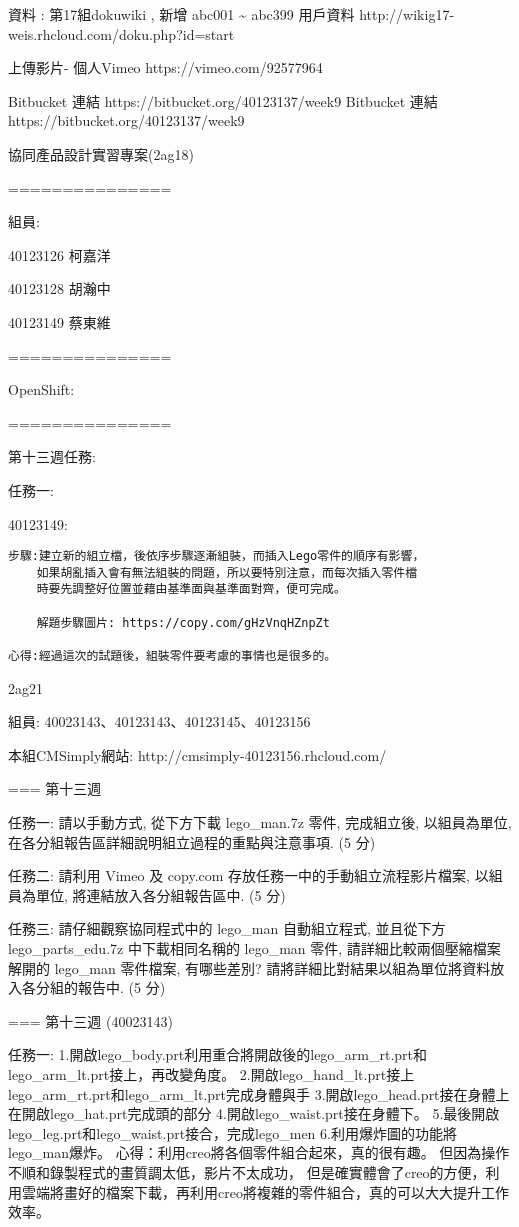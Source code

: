\documentclass[]{article}
\begin{document}
資料 : 第17組dokuwiki , 新增 abc001 \textasciitilde{} abc399 用戶資料
http://wikig17-weis.rhcloud.com/doku.php?id=start

上傳影片- 個人Vimeo https://vimeo.com/92577964

Bitbucket 連結 https://bitbucket.org/40123137/week9 Bitbucket 連結
https://bitbucket.org/40123137/week9

協同產品設計實習專案(2ag18)

===============

組員:

40123126 柯嘉洋

40123128 胡瀚中

40123149 蔡東維

===============

OpenShift:

===============

第十三週任務:

任務一:

40123149:

\begin{verbatim}
步驟:建立新的組立檔，後依序步驟逐漸組裝，而插入Lego零件的順序有影響，
    如果胡亂插入會有無法組裝的問題，所以要特別注意，而每次插入零件檔
    時要先調整好位置並藉由基準面與基準面對齊，便可完成。

    解題步驟圖片: https://copy.com/gHzVnqHZnpZt
    
心得:經過這次的試題後，組裝零件要考慮的事情也是很多的。
\end{verbatim}

2ag21

組員: 40023143、40123143、40123145、40123156

本組CMSimply網站: http://cmsimply-40123156.rhcloud.com/

=== 第十三週

任務一: 請以手動方式, 從下方下載 lego\_man.7z 零件, 完成組立後,
以組員為單位, 在各分組報告區詳細說明組立過程的重點與注意事項. (5 分)

任務二: 請利用 Vimeo 及 copy.com 存放任務一中的手動組立流程影片檔案,
以組員為單位, 將連結放入各分組報告區中. (5 分)

任務三: 請仔細觀察協同程式中的 lego\_man 自動組立程式, 並且從下方
lego\_parts\_edu.7z 中下載相同名稱的 lego\_man 零件,
請詳細比較兩個壓縮檔案解開的 lego\_man 零件檔案, 有哪些差別?
請將詳細比對結果以組為單位將資料放入各分組的報告中. (5 分)

=== 第十三週 (40023143)

任務一:
1.開啟lego\_body.prt利用重合將開啟後的lego\_arm\_rt.prt和lego\_arm\_lt.prt接上，再改變角度。
2.開啟lego\_hand\_lt.prt接上lego\_arm\_rt.prt和lego\_arm\_lt.prt完成身體與手
3.開啟lego\_head.prt接在身體上在開啟lego\_hat.prt完成頭的部分
4.開啟lego\_waist.prt接在身體下。
5.最後開啟lego\_leg.prt和lego\_waist.prt接合，完成lego\_men
6.利用爆炸圖的功能將lego\_man爆炸。
心得：利用creo將各個零件組合起來，真的很有趣。
但因為操作不順和錄製程式的畫質調太低，影片不太成功，
但是確實體會了creo的方便，利用雲端將畫好的檔案下載，再利用creo將複雜的零件組合，真的可以大大提升工作效率。
\end{document}
